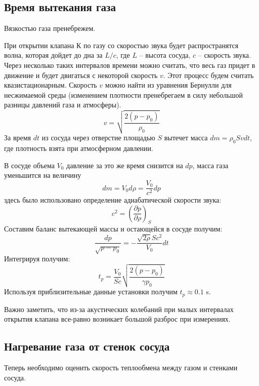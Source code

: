 \documentclass[a4paper,12pt]{report}
\begin{document}
\begin{multicols}{2}
    \subsection*{Время вытекания газа}
    Вязкостью газа пренебрежем.

    При открытии клапана К по газу со скоростью звука будет распространятся волна, которая дойдет до дна за $L/c$, где $L$ -- высота сосуда, $c$ -- скорость звука. Через несколько таких интервалов времени можно считать, что весь газ придет в движение и будет двигаться с некоторой скорость $v$. Этот процесс будем считать квазистационарным. Скорость $v$ можно найти из уравнения Бернулли для несжимаемой среды (изменением плотности пренебрегаем в силу небольшой разницы давлений газа и атмосферы).
    \begin{equation}
        \label{v}
        v=\sqrt{\frac{2(p-p_0)}{\rho_0}}
    \end{equation}
    За время $dt$ из сосуда через отверстие площадью $S$ вытечет масса $dm=\rho_0 S vdt$, где плотность взята при атмосферном давлении.

    В сосуде объема $V_0$ давление за это же время снизится на $dp$, масса газа уменьшится на величину
    \begin{equation*}
        dm=V_0d\rho=\frac{V_0}{c^2}dp
    \end{equation*}
    здесь было использовано определение адиабатической скорости звука:
    \begin{equation*}
        c^2=\left(\frac{\partial p}{\partial \rho}\right)_S
    \end{equation*}
    Составим баланс вытекающей массы и остающейся в сосуде получим:
    \begin{equation*}
        \frac{dp}{\sqrt{p-p_0}}=-\frac{\sqrt{2\rho}Sc^2}{V_0}dt
    \end{equation*}
    Интегрируя получим:
    \begin{equation}
        \label{t_p}
        t_p=\frac{V_0}{Sc}\sqrt{\frac{2(p-p_0)}{\gamma p_0}}
    \end{equation}
    Используя приблизительные данные установки получим $t_p\approx 0.1$ s.

    Важно заметить, что из-за акустических колебаний при малых интервалах открытия клапана все-равно возникает большой разброс при измерениях. 

    \subsection*{Нагревание газа от стенок сосуда} Теперь необходимо оценить скорость теплообмена между газом и стенками сосуда.


\end{multicols}
\end{document}
